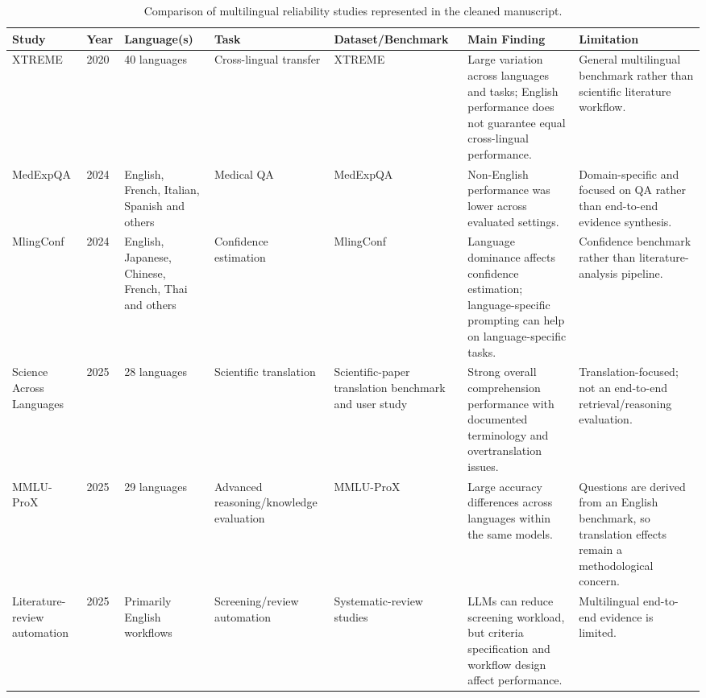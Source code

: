 \documentclass[acmsmall,nonacm]{acmart}
\begin{document}
\begin{table}[t]
\caption{Comparison of multilingual reliability studies represented in the cleaned manuscript.}
\label{tab:literature-comparison}
\scriptsize
\renewcommand{\arraystretch}{0.92}
\begin{tabularx}{\textwidth}{p{2.0cm}p{0.7cm}p{1.8cm}p{1.8cm}Y Y Y}
\toprule
Study & Year & Language(s) & Task & Dataset/Benchmark & Main Finding & Limitation \\
\midrule
XTREME \cite{Hu2020} & 2020 & 40 languages & Cross-lingual transfer & XTREME & Large variation across languages and tasks; English performance does not guarantee equal cross-lingual performance. & General multilingual benchmark rather than scientific literature workflow. \\
MedExpQA \cite{GarcíaFerrero2024} & 2024 & English, French, Italian, Spanish and others & Medical QA & MedExpQA & Non-English performance was lower across evaluated settings. & Domain-specific and focused on QA rather than end-to-end evidence synthesis. \\
MlingConf \cite{Xue2024} & 2024 & English, Japanese, Chinese, French, Thai and others & Confidence estimation & MlingConf & Language dominance affects confidence estimation; language-specific prompting can help on language-specific tasks. & Confidence benchmark rather than literature-analysis pipeline. \\
Science Across Languages \cite{Kleidermacher2025} & 2025 & 28 languages & Scientific translation & Scientific-paper translation benchmark and user study & Strong overall comprehension performance with documented terminology and overtranslation issues. & Translation-focused; not an end-to-end retrieval/reasoning evaluation. \\
MMLU-ProX \cite{Xuan2025} & 2025 & 29 languages & Advanced reasoning/knowledge evaluation & MMLU-ProX & Large accuracy differences across languages within the same models. & Questions are derived from an English benchmark, so translation effects remain a methodological concern. \\
Literature-review automation \cite{Scherbakov2025,DelgadoChaves2025} & 2025 & Primarily English workflows & Screening/review automation & Systematic-review studies & LLMs can reduce screening workload, but criteria specification and workflow design affect performance. & Multilingual end-to-end evidence is limited. \\
\bottomrule
\end{tabularx}
\end{table}
\end{document}
